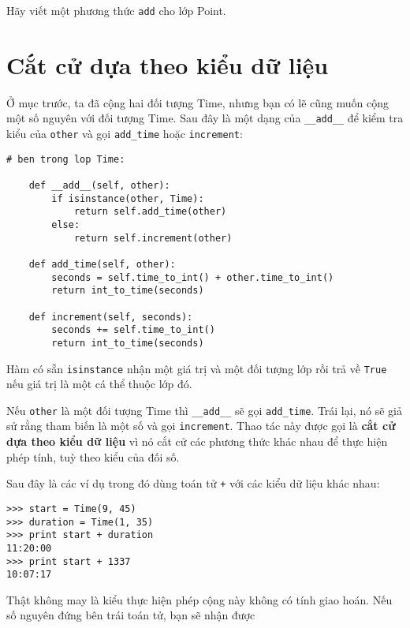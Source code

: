 \documentclass[11pt]{book}
\begin{document}
\begin{ex}
Hãy viết một phương thức {\tt add} cho lớp Point.  
\end{ex}


\section{Cắt cử dựa theo kiểu dữ liệu}

Ở mục trước, ta đã cộng hai đối tượng Time, nhưng bạn có lẽ
cũng muốn cộng một số nguyên với đối tượng Time. Sau đây
là một dạng của  \verb"__add__"
để kiểm tra kiểu của {\tt other} và gọi 
\verb"add_time" hoặc {\tt increment}:

\beforeverb
\begin{verbatim}
# ben trong lop Time:

    def __add__(self, other):
        if isinstance(other, Time):
            return self.add_time(other)
        else:
            return self.increment(other)

    def add_time(self, other):
        seconds = self.time_to_int() + other.time_to_int()
        return int_to_time(seconds)

    def increment(self, seconds):
        seconds += self.time_to_int()
        return int_to_time(seconds)
\end{verbatim}
\afterverb
%
Hàm có sẵn {\tt isinstance} nhận một giá trị và một 
đối tượng lớp rồi trả về  {\tt True} nếu giá trị là một cá thể thuộc
lớp đó.


Nếu {\tt other} là một đối tượng Time thì \verb"__add__" sẽ gọi
\verb"add_time".  Trái lại, nó sẽ giả sử rằng tham biến là một số 
và gọi {\tt increment}.  Thao tác này được 
gọi là {\bf cắt cử dựa theo kiểu dữ liệu} vì nó cắt cử 
các phương thức khác nhau để thực hiện phép tính, tuỳ theo
kiểu của đối số.


Sau đây là các ví dụ trong đó dùng toán tử {\tt +} với các kiểu
dữ liệu khác nhau:

\beforeverb
\begin{verbatim}
>>> start = Time(9, 45)
>>> duration = Time(1, 35)
>>> print start + duration
11:20:00
>>> print start + 1337
10:07:17
\end{verbatim}
\afterverb
%
Thật không may là kiểu thực hiện phép cộng này không có tính giao hoán.
Nếu số nguyên đứng bên trái toán tử, bạn sẽ nhận được
\end{document}
